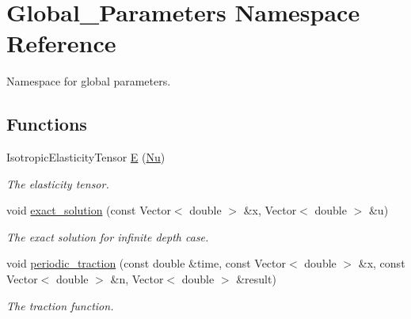 \hypertarget{namespaceGlobal__Parameters}{}\section{Global\+\_\+\+Parameters Namespace Reference}
\label{namespaceGlobal__Parameters}


Namespace for global parameters.  


\subsection*{Functions}
\begin{DoxyCompactItemize}
\item 
Isotropic\+Elasticity\+Tensor \hyperlink{namespaceGlobal__Parameters_a397f48e074d2589259ed5c6e4d89f948}{E} (\hyperlink{namespaceGlobal__Parameters_a20fccdcfa2c15ad8b951b9ada3bb1661}{Nu})
\begin{DoxyCompactList}\small\item\em The elasticity tensor. \end{DoxyCompactList}\item 
void \hyperlink{namespaceGlobal__Parameters_a6e53a9e4370e8719e9091eff6b6a0c01}{exact\+\_\+solution} (const Vector$<$ double $>$ \&x, Vector$<$ double $>$ \&u)
\begin{DoxyCompactList}\small\item\em The exact solution for infinite depth case. \end{DoxyCompactList}\item 
void \hyperlink{namespaceGlobal__Parameters_a003c4c942a4c8b88b417f139fc5c637c}{periodic\+\_\+traction} (const double \&time, const Vector$<$ double $>$ \&x, const Vector$<$ double $>$ \&n, Vector$<$ double $>$ \&result)
\begin{DoxyCompactList}\small\item\em The traction function. \end{DoxyCompactList}\end{DoxyCompactItemize}
